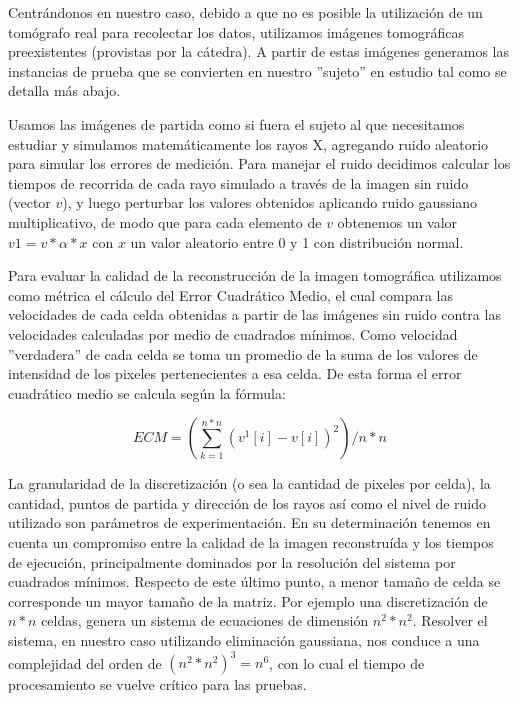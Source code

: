\par Centrándonos en nuestro caso, debido a que no es posible la utilización de un tomógrafo real para recolectar los datos, utilizamos imágenes tomográficas preexistentes (provistas por la cátedra). A partir de estas imágenes generamos las instancias de prueba que se convierten en nuestro ''sujeto'' en estudio tal como se detalla más abajo.

\par Usamos las imágenes de partida como si fuera el sujeto al que necesitamos estudiar y simulamos matemáticamente los rayos X, agregando ruido aleatorio para simular los errores de medición. Para manejar el ruido decidimos calcular los tiempos de recorrida de cada rayo simulado a través de la imagen sin ruido (vector $v$), y luego perturbar los valores obtenidos aplicando ruido gaussiano multiplicativo, de modo que para cada elemento de $v$ obtenemos un valor $v{1}=v * \alpha * x$ con $x$ un valor aleatorio entre 0 y 1 con distribución normal.

\par Para evaluar la calidad de la reconstrucción de la imagen tomográfica utilizamos como métrica el cálculo del Error Cuadrático Medio, el cual compara las velocidades de cada celda obtenidas a partir de las imágenes sin ruido contra las velocidades calculadas por medio de cuadrados mínimos. Como velocidad ''verdadera'' de cada celda se toma un promedio de la suma de los valores de intensidad de los pixeles pertenecientes a esa celda. De esta forma el error cuadrático medio se calcula según la fórmula:

\begin{displaymath}
ECM =(\sum_{k=1}^{n*n} (v^{1}[i] - v[i])^{2})/n*n
\end{displaymath}


\par La granularidad de la discretización (o sea la cantidad de pixeles por celda), la cantidad, puntos de partida y dirección de los rayos así como el nivel de ruido utilizado son parámetros de experimentación. En su determinación tenemos en cuenta un compromiso entre la calidad de la imagen reconstruída y los tiempos de ejecución, principalmente dominados por la resolución del sistema por cuadrados mínimos. Respecto de este último punto, a menor tamaño de celda se corresponde un mayor tamaño de la matriz. Por ejemplo una discretización de $n*n$ celdas, genera un sistema de ecuaciones de dimensión $n^{2}*n^{2}$. Resolver el sistema, en  nuestro caso utilizando eliminación gaussiana, nos conduce a una complejidad del orden de $(n^{2}*n^{2})^3 = n^{6}$, con lo cual el tiempo de procesamiento se vuelve crítico para las pruebas.




